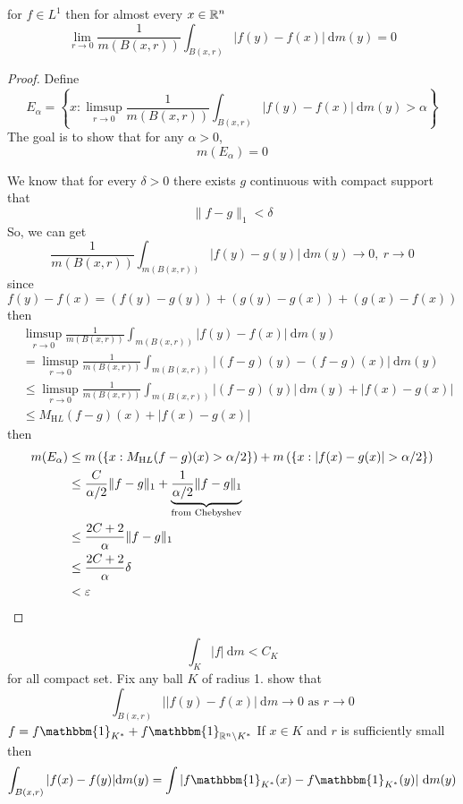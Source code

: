 \begin{theorem}
  for $f \in L^1$ then for almost every $x \in \mathbb R^n$
  \[\lim_{r \to 0} \frac1{m(B(x, r))}\int_{B(x, r)} |f(y) - f(x)| \ \mathrm{d}m(y) = 0\]
\end{theorem}

\begin{proof}
  Define 
  \[E_\alpha = \left\{x : \limsup_{r \to 0} \frac1{m(B(x, r))}\int_{B(x, r)} |f(y) - f(x)| \ \mathrm{d}m(y) > \alpha\right\}\]
  The goal is to show that for any $\alpha > 0$,
  \[m\left(E_\alpha\right) = 0\]

  We know that for every $\delta > 0$ there exists $g$ continuous with compact support that
  \[\|f-g\|_1 < \delta\]
  So, we can get
  \[\frac{1}{m(B(x, r))}\int_{m(B(x, r))} |f(y) - g(y)| \ \mathrm{d}m(y) \to 0, \ r\to0\]
  since $f(y)-f(x) = (f(y) - g(y)) + (g(y) - g(x)) + (g(x) - f(x))$ then 
  \begin{align*}
    &\limsup_{r\to0} \frac{1}{m(B(x, r))}\int_{m(B(x, r))} |f(y)-f(x)| \ \mathrm{d}m(y) \\
    &=\limsup_{r\to0} \frac{1}{m(B(x, r))}\int_{m(B(x, r))} |(f-g)(y) - (f-g)(x)| \ \mathrm{d}m(y) \\
    &\le \limsup_{r\to0} \frac{1}{m(B(x, r))}\int_{m(B(x, r))} |(f-g)(y)|  \ \mathrm{d}m(y) + |f(x)-g(x)| \\
    &\le M_{\mathrm HL}(f-g)(x) + |f(x) - g(x)| 
  \end{align*}
  then 
  \begin{align*}
    m(E_\alpha) &\le m\left(\left\{x : M_{\mathrm HL}(f-g)(x) > \alpha/2\right\}\right) + m\left(\left\{x : |f(x) - g(x)| > \alpha/2\right\}\right) \\
    &\le \frac{C}{\alpha/2} \|f-g\|_1 + \underbrace{\frac{1}{\alpha/2} \|f-g\|_1}_{\text{from Chebyshev}} \\
    &\le \frac{2C+2}{\alpha} \|f-g\|_1 \\
    &\le \frac{2C+2}{\alpha} \delta \\
    &< \varepsilon
  \end{align*}
\end{proof}

\[\int_K |f| \ \mathrm{d}m < C_K\]
for all compact set.
Fix any ball $K$ of radius 1. show that
\[\int_{B(x, r)}||f(y) - f(x)| \ \mathrm dm \to 0 \text{ as } r \to 0\]
$f = f \mathbbm{1}_{K^*} + f \mathbbm{1}_{\RR^n \setminus K^*}$
If $x \in K$ and $r$ is sufficiently small then
\[\int_{B(x, r)} |f(x) - f(y)| \mathrm{d}m(y) = \int |f \mathbbm{1}_{K^*}(x) - f \mathbbm{1}_{K^*}(y)| \ \mathrm{d}m(y)\]

